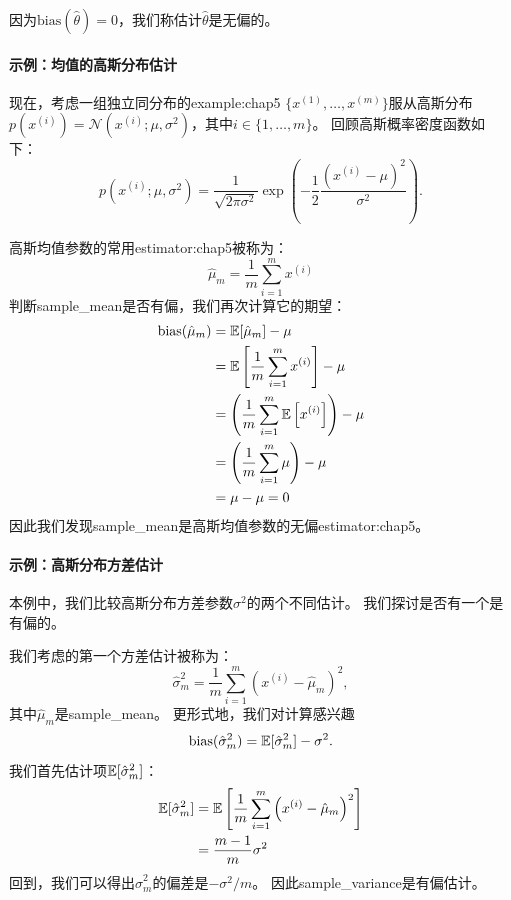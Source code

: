 因为$\text{bias}(\hat{\theta})=0$，我们称估计$\hat{\theta}$是无偏的。

\paragraph{示例：均值的高斯分布估计}
现在，考虑一组独立同分布的\gls{example:chap5} $\{x^{(1)}, \dots , x^{(m)}\}$服从高斯分布$p(x^{(i)}) = \mathcal{N}(x^{(i)}; \mu, \sigma^2)$，其中$i\in\{1, \dots, m\}$。
回顾高斯概率密度函数如下：
\begin{equation}
    p(x^{(i)}; \mu, \sigma^2) = \frac{1}{\sqrt{2\pi\sigma^2}} \exp\left( -\frac{1}{2} \frac{(x^{(i)} - \mu)^2}{\sigma^2}  \right).
\end{equation}

高斯均值参数的常用\gls{estimator:chap5}被称为：
\begin{equation}
    \hat{\mu}_m = \frac{1}{m} \sum_{i=1}^m x^{(i)}
\end{equation}
判断\gls{sample_mean}是否有偏，我们再次计算它的期望：
\begin{align}
\text{bias} (\hat{\mu}_m) &= \mathbb{E}[ \hat{\mu}_m ]  - \mu \\
    &= \mathbb{E} \left[ \frac{1}{m} \sum_{i=1}^m x^{(i)}  \right] - \mu \\
    &= \left( \frac{1}{m}\sum_{i=1}^m \mathbb{E} \left[ x^{(i)} \right] \right) - \mu \\
    &= \left( \frac{1}{m}\sum_{i=1}^m \mu \right) - \mu \\
    &= \mu - \mu = 0
\end{align}
因此我们发现\gls{sample_mean}是高斯均值参数的无偏\gls{estimator:chap5}。


\paragraph{示例：高斯分布方差估计}
本例中，我们比较高斯分布方差参数$\sigma^2$的两个不同估计。
我们探讨是否有一个是有偏的。

我们考虑的第一个方差估计被称为：
\begin{equation}
    \hat{\sigma}_m^2 = \frac{1}{m} \sum_{i=1}^m \left( x^{(i)} - \hat{\mu}_m \right)^2,
\end{equation}
其中$\hat{\mu}_m$是\gls{sample_mean}。
更形式地，我们对计算感兴趣
\begin{equation}
\label{eq:5.37}
    \text{bias} (\hat{\sigma}_m^2) = \mathbb{E} [ \hat{\sigma}_m^2 ]  - \sigma^2.
\end{equation}
我们首先估计项$\mathbb{E} [ \hat{\sigma}_m^2 ]$：
\begin{align}
    \mathbb{E} [ \hat{\sigma}_m^2 ]  &= \mathbb{E} \left[ \frac{1}{m} \sum_{i=1}^m \left( x^{(i)} - \hat{\mu}_m \right)^2  \right] \\
    &= \frac{m-1}{m} \sigma^2
\end{align}
回到，我们可以得出$\hat{\sigma}^2_m$的偏差是$-\sigma^2/m$。
因此\gls{sample_variance}是有偏估计。

